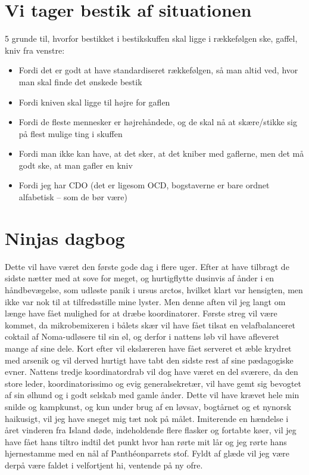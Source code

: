 

\begin{minipage}[b]{0.95\linewidth}
\begin{minipage}[t]{0.47\textwidth}
\vspace{3mm}
\section*{Vi tager bestik af situationen}

5 grunde til, hvorfor bestikket i bestikskuffen skal ligge i rækkefølgen ske, gaffel, kniv fra venstre:

\begin{itemize}
\item Fordi det er godt at have standardiseret rækkefølgen, så man altid ved, hvor man skal finde det ønskede bestik
\item Fordi kniven skal ligge til højre for gaflen
\item Fordi de fleste mennesker er højrehåndede, og de skal nå at skære/stikke sig på flest mulige ting i skuffen
\item Fordi man ikke kan have, at det sker, at det kniber med gaflerne, men det må godt ske, at man gafler en kniv
\item Fordi jeg har CDO (det er ligesom OCD, bogstaverne er bare ordnet alfabetisk – som de bør være)
\end{itemize}

\section*{Ninjas dagbog}

Dette vil have været den første gode dag i flere uger. Efter at have tilbragt de sidste nætter med at sove for meget, og hurtigflytte dusinvis af ånder i en håndbevægelse, som udløste panik i ursus arctos, hvilket klart var hensigten, men ikke var nok til at tilfredsstille mine lyster. Men denne aften vil jeg langt om længe have fået mulighed for at dræbe koordinatorer. Første streg vil være kommet, da mikrobemixeren i bålets skær vil have fået tilsat en velafbalanceret coktail af Noma-udløsere til sin øl, og derfor i nattens løb vil have afleveret mange af sine dele. Kort efter vil ekslæreren have fået serveret et æble krydret med arsenik og vil derved hurtigt have tabt den sidste rest af sine pædagogiske evner. Nattens tredje koordinatordrab vil dog have været en del sværere, da den store leder, koordinatorissimo og evig generalsekretær, vil have gemt sig bevogtet af sin ølhund og i godt selskab med gamle ånder. Dette vil have krævet hele min snilde og kampkunst, og kun under brug af en løvsav, bogtårnet og et nynorsk haikusigt, vil jeg have sneget mig tæt nok på målet. Imiterende en hændelse i året vinderen fra Island døde, indeholdende flere flasker og fortabte køer, vil jeg have fået hans tiltro indtil det punkt hvor han rørte mit lår og jeg rørte hans hjernestamme med en nål af Panthéonparrets stof. Fyldt af glæde vil jeg være derpå være faldet i velfortjent hi, ventende på ny ofre.


\end{minipage}
\end{minipage}

